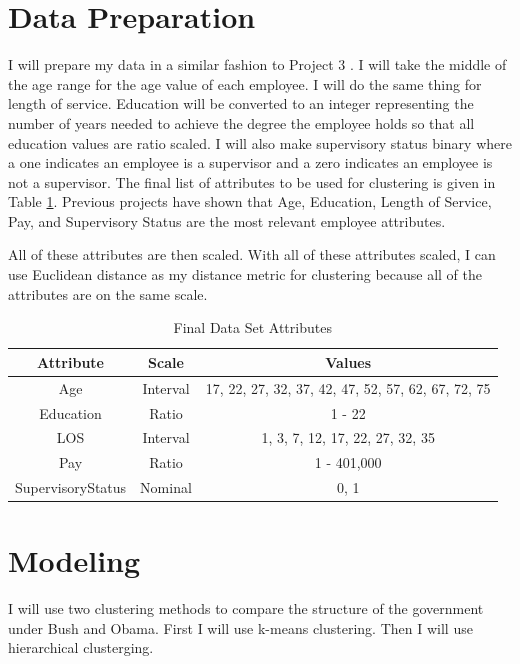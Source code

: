 \documentclass{article}
\begin{document}
\section{Data Preparation}
I will prepare my data in a similar fashion to Project 3 \cite{proj3}. I will take the middle of the age range for the age value of each employee. I will do the same thing for length of service. Education will be converted to an integer representing the number of years needed to achieve the degree the employee holds so that all education values are ratio scaled. I will also make supervisory status binary where a one indicates an employee is a supervisor and a zero indicates an employee is not a supervisor. The final list of attributes to be used for clustering is given in Table \ref{tab:1}. Previous projects have shown that Age, Education, Length of Service, Pay, and Supervisory Status are the most relevant employee attributes.
\par
All of these attributes are then scaled. With all of these attributes scaled, I can use Euclidean distance as my distance metric for clustering because all of the attributes are on the same scale.

    \begin{center}
        \begin{table}
            \centering
            \begin{tabular}{ |c|c|c| }
                \hline
                Attribute & Scale & Values \\
                \hline
                Age & Interval & 17, 22, 27, 32, 37, 42, 47, 52, 57, 62, 67, 72, 75 \\
                Education & Ratio & 1 - 22 \\
                LOS & Interval & 1, 3, 7, 12, 17, 22, 27, 32, 35 \\
                Pay & Ratio & 1 - 401,000 \\
                SupervisoryStatus & Nominal & 0, 1 \\
                \hline
            \end{tabular}
            \caption{Final Data Set Attributes}
            \label{tab:1}
        \end{table}
    \end{center}

\section{Modeling}
I will use two clustering methods to compare the structure of the government under Bush and Obama. First I will use k-means clustering. Then I will use hierarchical clusterging.
\end{document}
